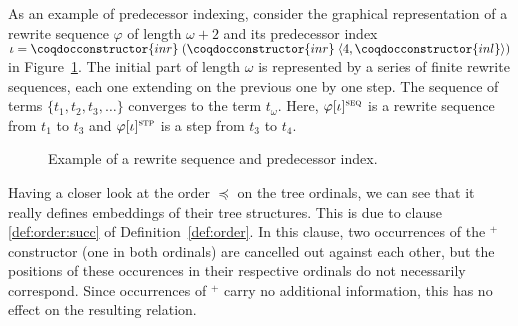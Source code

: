 As an example of predecessor indexing, consider the graphical
representation of a rewrite sequence $\varphi$ of length $\omega + 2$
and its predecessor index $\iota = \coqdocconstructor{inr} \;
(\coqdocconstructor{inr} \; \langle 4,
\coqdocconstructor{inl}\rangle)$ in Figure~\ref{fig:pred}. The initial
part of length $\omega$ is represented by a series of finite rewrite
sequences, each one extending on the previous one by one step. The
sequence of terms $\{ t_1,t_2, t_3, \ldots \}$ converges to the term
$t_\omega$. Here, $\varphi[\iota]^\textsc{seq}$ is a rewrite sequence
from $t_1$ to $t_3$ and $\varphi[\iota]^\textsc{stp}$ is a step from
$t_3$ to $t_4$.

\begin{figure}
\begin{center}
\begin{tikzpicture}[scale=0.85]

\end{tikzpicture}
\end{center}
\caption{Example of a rewrite sequence and predecessor
  index.}\label{fig:pred}
\end{figure}

Having a closer look at the order $\preceq$ on the tree ordinals, we can
see that it really defines embeddings of their tree structures. This is due to
clause {\sc \ref{def:order:succ}} of Definition~\ref{def:order}. In
this clause, two occurrences of the $^+$ constructor (one in both
ordinals) are cancelled out against each other, but the positions of
these occurences in their respective ordinals do not necessarily
correspond. Since occurrences of $^+$ carry no additional information,
this has no effect on the resulting relation.

